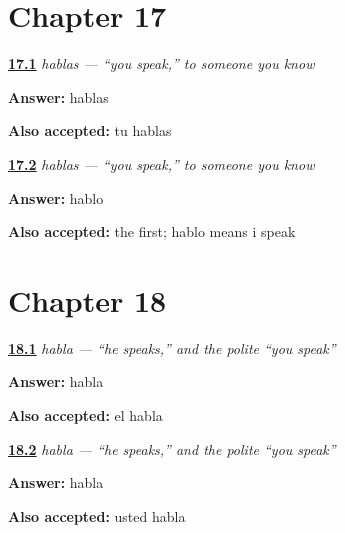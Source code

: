 \section*{Chapter 17}

\noindent\begin{minipage}[t]{\linewidth}
\raggedright
\hyperlink{review-ES-C06-hablas-form}{\textbf{17.1}} \emph{hablas — \textquotedblleft{}you speak,\textquotedblright{} to someone you know}\par
\small \textbf{Answer:} hablas\par
\footnotesize \textbf{Also accepted:} tu hablas
\end{minipage}\par\medskip

\noindent\begin{minipage}[t]{\linewidth}
\raggedright
\hyperlink{review-ES-C06-hablas-contrast}{\textbf{17.2}} \emph{hablas — \textquotedblleft{}you speak,\textquotedblright{} to someone you know}\par
\small \textbf{Answer:} hablo\par
\footnotesize \textbf{Also accepted:} the first; hablo means i speak
\end{minipage}\par\medskip

\section*{Chapter 18}

\noindent\begin{minipage}[t]{\linewidth}
\raggedright
\hyperlink{review-ES-C06-habla-form}{\textbf{18.1}} \emph{habla — \textquotedblleft{}he speaks,\textquotedblright{} and the polite \textquotedblleft{}you speak\textquotedblright{}}\par
\small \textbf{Answer:} habla\par
\footnotesize \textbf{Also accepted:} el habla
\end{minipage}\par\medskip

\noindent\begin{minipage}[t]{\linewidth}
\raggedright
\hyperlink{review-ES-C06-habla-usted}{\textbf{18.2}} \emph{habla — \textquotedblleft{}he speaks,\textquotedblright{} and the polite \textquotedblleft{}you speak\textquotedblright{}}\par
\small \textbf{Answer:} habla\par
\footnotesize \textbf{Also accepted:} usted habla
\end{minipage}\par\medskip

